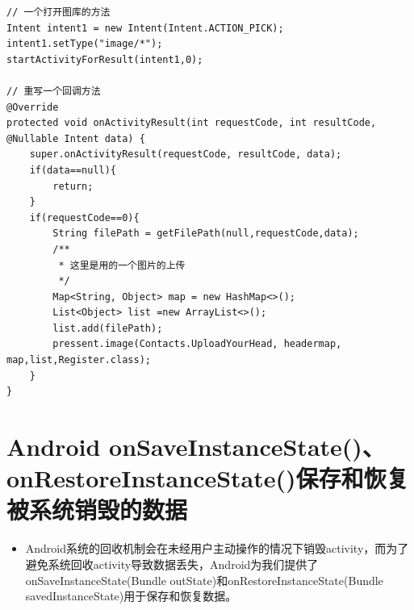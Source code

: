 \documentclass[9pt, b5paper]{article}
\begin{document}
\begin{verbatim}
// 一个打开图库的方法
Intent intent1 = new Intent(Intent.ACTION_PICK);
intent1.setType("image/*");
startActivityForResult(intent1,0);

// 重写一个回调方法
@Override
protected void onActivityResult(int requestCode, int resultCode, @Nullable Intent data) {
    super.onActivityResult(requestCode, resultCode, data);
    if(data==null){
        return;
    }
    if(requestCode==0){
        String filePath = getFilePath(null,requestCode,data);
        /**
         * 这里是用的一个图片的上传
         */
        Map<String, Object> map = new HashMap<>();
        List<Object> list =new ArrayList<>();
        list.add(filePath);
        pressent.image(Contacts.UploadYourHead, headermap, map,list,Register.class);
    }
}
\end{verbatim}

\section{Android onSaveInstanceState()、onRestoreInstanceState()保存和恢复被系统销毁的数据}
\label{sec-11}
\begin{itemize}
\item Android系统的回收机制会在未经用户主动操作的情况下销毁activity，而为了避免系统回收activity导致数据丢失，Android为我们提供了onSaveInstanceState(Bundle outState)和onRestoreInstanceState(Bundle savedInstanceState)用于保存和恢复数据。
\end{itemize}
\end{document}

